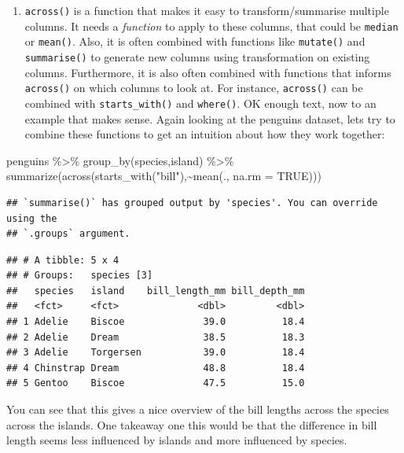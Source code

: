 \documentclass[
]{book}
\newenvironment{Shaded}{\begin{snugshade}}{\end{snugshade}}
\newcommand{\AttributeTok}[1]{\textcolor[rgb]{0.77,0.63,0.00}{#1}}
\newcommand{\ConstantTok}[1]{\textcolor[rgb]{0.00,0.00,0.00}{#1}}
\newcommand{\FunctionTok}[1]{\textcolor[rgb]{0.00,0.00,0.00}{#1}}
\newcommand{\NormalTok}[1]{#1}
\newcommand{\SpecialCharTok}[1]{\textcolor[rgb]{0.00,0.00,0.00}{#1}}
\newcommand{\StringTok}[1]{\textcolor[rgb]{0.31,0.60,0.02}{#1}}
\providecommand{\tightlist}{%
  \setlength{\itemsep}{0pt}\setlength{\parskip}{0pt}}
\begin{document}
\begin{enumerate}
\def\labelenumi{\arabic{enumi}.}
\tightlist
\item
  \texttt{across()} is a function that makes it easy to
  transform/summarise multiple columns. It needs a \emph{function} to
  apply to these columns, that could be \texttt{median} or
  \texttt{mean()}. Also, it is often combined with functions like
  \texttt{mutate()} and \texttt{summarise()} to generate new columns
  using transformation on existing columns. Furthermore, it is also
  often combined with functions that informs \texttt{across()} on which
  columns to look at. For instance, \texttt{across()} can be combined
  with \texttt{starts\_with()} and \texttt{where()}. OK enough text, now
  to an example that makes sense. Again looking at the penguins dataset,
  lets try to combine these functions to get an intuition about how they
  work together:
\end{enumerate}

\begin{Shaded}
\begin{Highlighting}[]
\NormalTok{  penguins }\SpecialCharTok{\%\textgreater{}\%} 
  \FunctionTok{group\_by}\NormalTok{(species,island) }\SpecialCharTok{\%\textgreater{}\%} 
  \FunctionTok{summarize}\NormalTok{(}\FunctionTok{across}\NormalTok{(}\FunctionTok{starts\_with}\NormalTok{(}\StringTok{"bill"}\NormalTok{),}\SpecialCharTok{\textasciitilde{}}\FunctionTok{mean}\NormalTok{(., }\AttributeTok{na.rm =} \ConstantTok{TRUE}\NormalTok{)))}
\end{Highlighting}
\end{Shaded}

\begin{verbatim}
## `summarise()` has grouped output by 'species'. You can override using the
## `.groups` argument.
\end{verbatim}

\begin{verbatim}
## # A tibble: 5 x 4
## # Groups:   species [3]
##   species   island    bill_length_mm bill_depth_mm
##   <fct>     <fct>              <dbl>         <dbl>
## 1 Adelie    Biscoe              39.0          18.4
## 2 Adelie    Dream               38.5          18.3
## 3 Adelie    Torgersen           39.0          18.4
## 4 Chinstrap Dream               48.8          18.4
## 5 Gentoo    Biscoe              47.5          15.0
\end{verbatim}

You can see that this gives a nice overview of the bill lengths across
the species across the islands. One takeaway one this would be that the
difference in bill length seems less influenced by islands and more
influenced by species.
\end{document}
